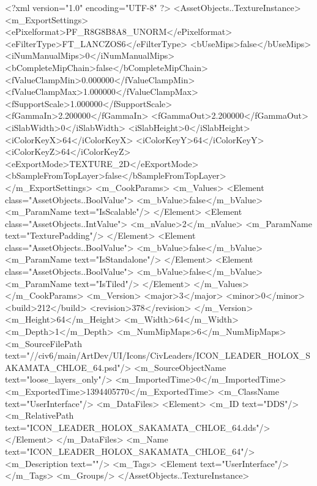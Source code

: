 <?xml version="1.0" encoding="UTF-8" ?>
<AssetObjects..TextureInstance>
	<m_ExportSettings>
		<ePixelformat>PF_R8G8B8A8_UNORM</ePixelformat>
		<eFilterType>FT_LANCZOS6</eFilterType>
		<bUseMips>false</bUseMips>
		<iNumManualMips>0</iNumManualMips>
		<bCompleteMipChain>false</bCompleteMipChain>
		<fValueClampMin>0.000000</fValueClampMin>
		<fValueClampMax>1.000000</fValueClampMax>
		<fSupportScale>1.000000</fSupportScale>
		<fGammaIn>2.200000</fGammaIn>
		<fGammaOut>2.200000</fGammaOut>
		<iSlabWidth>0</iSlabWidth>
		<iSlabHeight>0</iSlabHeight>
		<iColorKeyX>64</iColorKeyX>
		<iColorKeyY>64</iColorKeyY>
		<iColorKeyZ>64</iColorKeyZ>
		<eExportMode>TEXTURE_2D</eExportMode>
		<bSampleFromTopLayer>false</bSampleFromTopLayer>
	</m_ExportSettings>
	<m_CookParams>
		<m_Values>
			<Element class="AssetObjects..BoolValue">
				<m_bValue>false</m_bValue>
				<m_ParamName text="IsScalable"/>
			</Element>
			<Element class="AssetObjects..IntValue">
				<m_nValue>2</m_nValue>
				<m_ParamName text="TexturePadding"/>
			</Element>
			<Element class="AssetObjects..BoolValue">
				<m_bValue>false</m_bValue>
				<m_ParamName text="IsStandalone"/>
			</Element>
			<Element class="AssetObjects..BoolValue">
				<m_bValue>false</m_bValue>
				<m_ParamName text="IsTiled"/>
			</Element>
		</m_Values>
	</m_CookParams>
	<m_Version>
		<major>3</major>
		<minor>0</minor>
		<build>212</build>
		<revision>378</revision>
	</m_Version>
	<m_Height>64</m_Height>
	<m_Width>64</m_Width>
	<m_Depth>1</m_Depth>
	<m_NumMipMaps>6</m_NumMipMaps>
	<m_SourceFilePath text="//civ6/main/ArtDev/UI/Icons/CivLeaders/ICON_LEADER_HOLOX_SAKAMATA_CHLOE_64.psd"/>
	<m_SourceObjectName text="loose_layers_only"/>
	<m_ImportedTime>0</m_ImportedTime>
	<m_ExportedTime>1394405770</m_ExportedTime>
	<m_ClassName text="UserInterface"/>
	<m_DataFiles>
		<Element>
			<m_ID text="DDS"/>
			<m_RelativePath text="ICON_LEADER_HOLOX_SAKAMATA_CHLOE_64.dds"/>
		</Element>
	</m_DataFiles>
	<m_Name text="ICON_LEADER_HOLOX_SAKAMATA_CHLOE_64"/>
	<m_Description text=""/>
	<m_Tags>
		<Element text="UserInterface"/>
	</m_Tags>
	<m_Groups/>
</AssetObjects..TextureInstance>

